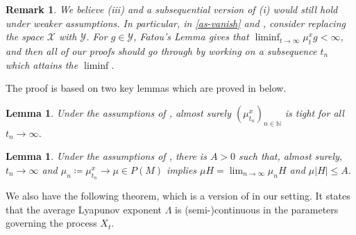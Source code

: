 \documentclass[final]{amsart}
\newtheorem{lem}[thm]{Lemma}
\newtheorem{rem}[thm]{Remark}
\numberwithin{thm}{section}
\numberwithin{equation}{section}
\newcommand{\N}{\mathbb{N}}
\newcommand{\X}{\mathcal{X}}
\newcommand{\Y}{\mathcal{Y}}
\begin{document}
\begin{rem}\label{rem:weaker-thm}
    We believe (iii) and a subsequential version of (i) would still hold under weaker assumptions. In particular, in \ref{as-vanish} and , consider replacing the space $\X$ with $\Y$. For $g \in \Y$, Fatou's Lemma gives that $\liminf_{t \to \infty} \mu_t^xg < \infty$, and then all of our proofs should go through by working on a subsequence $t_n$ which attains the $\liminf$.
\end{rem}

The proof is based on two key lemmas which are proved in  below. 

\begin{lem} \label{tightness}
    Under the assumptions of , almost surely $(\mu_{t_n}^x)_{n \in \N}$ is tight for all $t_n \to \infty$.
\end{lem}

\begin{lem} \label{muH-converge}
    Under the assumptions of , there is $A > 0$ such that, almost surely, $t_n \to \infty$ and $\mu_n \coloneqq \mu_{t_n}^x \to \mu \in P(M)$ implies $\mu H = \lim_{n \to \infty} \mu_n H$ and $\mu |H| \leq A$.
\end{lem}

We also have the following theorem, which is a version of \cite[Theorem 3.11]{extinction} in our setting. It states that the average Lyapunov exponent $\Lambda$ is (semi-)continuous in the parameters governing the process $X_t$.
\end{document}
